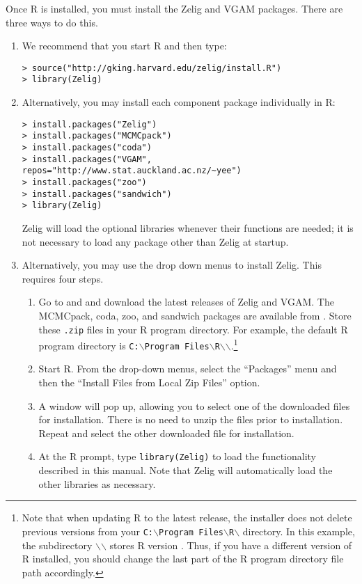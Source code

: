 Once R is installed, you must install the Zelig and VGAM packages.  There
are three ways to do this.  
\begin{enumerate}
\item We recommend that you start R and then type:
\begin{verbatim}
> source("http://gking.harvard.edu/zelig/install.R")
> library(Zelig)
\end{verbatim}
\item Alternatively, you may install each component package individually 
in R:
\begin{verbatim}
> install.packages("Zelig")
> install.packages("MCMCpack")
> install.packages("coda")
> install.packages("VGAM", repos="http://www.stat.auckland.ac.nz/~yee")
> install.packages("zoo")
> install.packages("sandwich")
> library(Zelig)
\end{verbatim}
Zelig will load the optional libraries whenever their functions are
needed; it is not necessary to load any package other than Zelig at startup.  

\item \label{manual.windows}Alternatively, you may use the drop down
  menus to install Zelig.  This requires four steps.
\begin{enumerate}
\item \label{win.zelig} Go to  and
  and download the latest releases of Zelig and VGAM.  The MCMCpack,
coda, zoo, and sandwich packages are available from
.  Store these
  \texttt{.zip} files in your R program directory.  For example, the
  default R program directory is {\tt C:$\backslash$Program
  Files$\backslash$R$\backslash$\rwvers$\backslash$}.\footnote{Note
  that when updating R to the latest release, the installer does not
  delete previous versions from your {\tt C:$\backslash$Program
  Files$\backslash$R$\backslash$} directory.  In this example, the
  subdirectory {\tt $\backslash$\rwvers$\backslash$} stores R version
  \fullrvers.  Thus, if you have a different version of R installed,
  you should change the last part of the R program directory file path
  accordingly.}
\item Start R.  From the drop-down menus, select the ``Packages'' menu
  and then the ``Install Files from Local Zip Files'' option.
\item A window will pop up, allowing you to select one of the
  downloaded files for installation.  There is no need to unzip the
  files prior to installation.  Repeat and select the other downloaded
  file for installation.
\item At the R prompt, type \texttt{library(Zelig)} to load the
  functionality described in this manual.  Note that Zelig will
  automatically load the other libraries as necessary.
\end{enumerate}


\end{enumerate}
